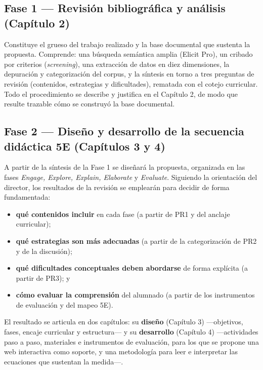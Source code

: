 \subsection{Fase 1 --- Revisión bibliográfica y análisis (Capítulo 2)}

Constituye el grueso del trabajo realizado y la base documental que sustenta la propuesta. Comprende: una búsqueda semántica amplia (Elicit Pro), un cribado por criterios (\textit{screening}), una extracción de datos en diez dimensiones, la depuración y categorización del corpus, y la síntesis en torno a tres preguntas de revisión (contenidos, estrategias y dificultades), rematada con el cotejo curricular. Todo el procedimiento se describe y justifica en el Capítulo 2, de modo que resulte trazable cómo se construyó la base documental.

\subsection{Fase 2 --- Diseño y desarrollo de la secuencia didáctica 5E (Capítulos 3 y 4)}

A partir de la síntesis de la Fase 1 se diseñará la propuesta, organizada en las fases \textit{Engage, Explore, Explain, Elaborate} y \textit{Evaluate}. Siguiendo la orientación del director, los resultados de la revisión se emplearán para decidir de forma fundamentada:

\begin{itemize}
\item \textbf{qué contenidos incluir} en cada fase (a partir de PR1 y del anclaje curricular);
\item \textbf{qué estrategias son más adecuadas} (a partir de la categorización de PR2 y de la discusión);
\item \textbf{qué dificultades conceptuales deben abordarse} de forma explícita (a partir de PR3); y
\item \textbf{cómo evaluar la comprensión} del alumnado (a partir de los instrumentos de evaluación y del mapeo 5E).
\end{itemize}

El resultado se articula en dos capítulos: su \textbf{diseño} (Capítulo 3) ---objetivos, fases, encaje curricular y estructura--- y su \textbf{desarrollo} (Capítulo 4) ---actividades paso a paso, materiales e instrumentos de evaluación, para los que se propone una web interactiva como soporte, y una metodología para leer e interpretar las ecuaciones que sustentan la medida---.

